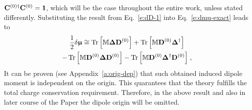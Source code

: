 \documentclass[aip,amsmath,amssymb,reprint]{revtex4-1}
\newcommand{\BM}[1]{\bm{#1}}
\DeclareMathOperator{\Tr}{Tr}
\begin{document}
${\bf C}^{(0)\dagger}{\bf C}^{(0)}={\bf 1}$,
which will be the case throughout the entire work, unless stated differently.
Substituting the result from Eq.~\eqref{e:dD-1}
into Eq.~\eqref{e:dmu-exact} leads to
%
\begin{multline} \label{e:dmu-4-exact.linear-approximation}
 \frac{1}{2} 
 \delta {\BM{\upmu}}
  \cong
   \Tr{ 
    \left[ 
         {\mathbb{M}} {\BM\Delta} {\bf D}^{(0)}  
    \right] }
%
  +\Tr{ 
    \left[ 
         {\mathbb{M}} {\bf D}^{(0)} {\BM\Delta}^{\dagger}
    \right] } \\
%
  -\Tr{ 
    \left[ 
         {\mathbb{M}} {\bf D}^{(0)} {\BM\Delta} {\bf D}^{(0)}
    \right] }
%
  -\Tr{ 
    \left[ 
         {\mathbb{M}} {\bf D}^{(0)} {\BM\Delta}^{\dagger} {\bf D}^{(0)}
    \right] } \;,
\end{multline}
%
It can be proven (see Appendix~\ref{a:orig-dep}) that such obtained
induced dipole moment is independent on the origin. 
This quarantees that the theory fulfills the total charge conservation requirement.
Therefore,
in the above result and also in later course of the Paper the dipole origin will be omitted. 
\end{document}
